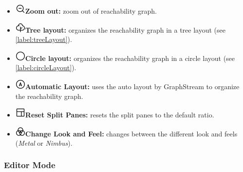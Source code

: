 \documentclass[10pt, a4paper]{article}
\begin{document}
\begin{itemize}
\item\includegraphics[scale=0.4]{../src/resources/images/Toolbar/zoom-out.png}\hspace{0.1cm}\textbf{Zoom out:} zoom out of reachability graph.
\item\includegraphics[scale=0.4]{../src/resources/images/Toolbar/tree-layout.png}\hspace{0.1cm}\textbf{Tree layout:} organizes the reachability graph in a tree layout (see \ref{label:treeLayout}).
\item\includegraphics[scale=0.4]{../src/resources/images/Toolbar/circle-layout.png}\hspace{0.1cm}\textbf{Circle layout:} organizes the reachability graph in a circle layout (see \ref{label:circleLayout}).
\item\includegraphics[scale=0.4]{../src/resources/images/Toolbar/auto-layout.png}\hspace{0.1cm}\textbf{Automatic Layout:} uses the auto layout by GraphStream to organize the reachability graph.
\item\includegraphics[scale=0.4]{../src/resources/images/Toolbar/layout.png}\hspace{0.1cm}\textbf{Reset Split Panes:} resets the split panes to the default ratio.
\item\includegraphics[scale=0.4]{../src/resources/images/Toolbar/design.png}\hspace{0.1cm}\textbf{Change Look and Feel:} changes between the different look and feels (\textit{Metal} or \textit{Nimbus}).
\end{itemize} 

\subsubsection{Editor Mode}
\label{label:editor}
\end{document}
